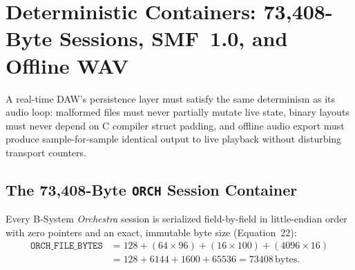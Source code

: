 \chapter{Deterministic Containers: 73,408-Byte Sessions, SMF~1.0, and Offline WAV}
\label{ch:containers}

A real-time DAW's persistence layer must satisfy the same determinism as its audio loop: malformed files must never partially mutate live state, binary layouts must never depend on C compiler struct padding, and offline audio export must produce sample-for-sample identical output to live playback without disturbing transport counters.

\section{The 73,408-Byte \texttt{ORCH} Session Container}

Every B-System \emph{Orchestra} session is serialized field-by-field in little-endian order with zero pointers and an exact, immutable byte size (Equation~22):
\begin{align}
\label{eq:session-size}
\texttt{ORCH\_FILE\_BYTES}
&= 128 + (64 \times 96) + (16 \times 100) + (4096 \times 16) \nonumber\\
&= 128 + 6144 + 1600 + 65536 = 73408\,\text{bytes}.
\end{align}

